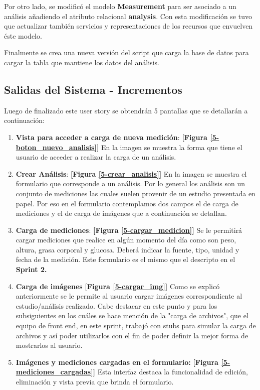 	Por otro lado, se modificó el modelo \textbf{Measurement} para ser asociado a un análisis añadiendo el atributo relacional \textbf{analysis}. Con esta modificación se tuvo que actualizar también servicios y representaciones de los recursos que envuelven éste modelo.
	
	Finalmente se crea una nueva versión del script que carga la base de datos para cargar la tabla que mantiene los datos del análisis.

\clearpage
\subsection {Salidas del Sistema - Incrementos}

Luego de finalizado este user story se obtendrán 5 pantallas que se detallarán a continuación:
\begin{enumerate}
	\item \textbf{Vista para acceder a carga de nueva medición}: \textbf{[Figura \ref{5-boton_nuevo_analisis}]} En la imagen se muestra la forma que tiene el usuario de acceder  a realizar la carga de un análisis.
    	\item \textbf{Crear Análisis}: \textbf{[Figura \ref{5-crear_analisis}]} En la imagen se muestra el formulario que corresponde a un análisis. Por lo general los análisis son un conjunto de mediciones las cuales suelen provenir de un estudio presentada en papel. Por eso en el formulario contemplamos dos campos el de carga de mediciones y el de carga de imágenes que a continuación se detallan.
        	\item \textbf{Carga de mediciones}: \textbf{[Figura \ref{5-cargar_medicion}]} Se le permitirá cargar mediciones que realice en algún momento del día como son peso, altura, grasa corporal y glucosa. Deberá indicar la fuente, tipo, unidad y fecha de la medición. Este formulario es el mismo que el descripto en el\textbf{ Sprint 2.}
    \item \textbf{Carga de imágenes}  \textbf{[Figura  \ref{5-cargar_img}]} Como se explicó anteriormente se le permite al usuario cargar imágenes correspondiente al estudio/análisis realizado. Cabe destacar en este punto y para los subsiguientes en los cuáles se hace mención de la "carga de archivos",  que el equipo de front end, en este sprint, trabajó con stubs para simular la carga de archivos y así poder utilizarlos con el fin de poder definir la mejor forma de mostrarlos al usuario.

    \item \textbf{Imágenes y mediciones cargadas en el formulario:}  \textbf{[Figura \ref{5-mediciones_cargadas}]} Esta interfaz destaca la funcionalidad de edición, eliminación y vista previa que brinda el formulario.

\end{enumerate}

